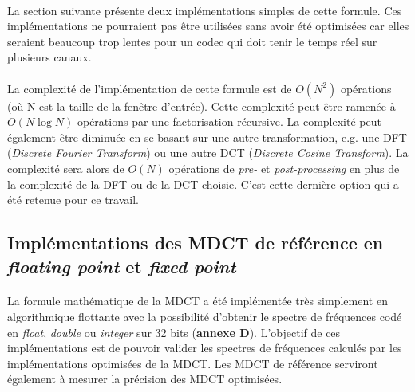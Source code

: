 \documentclass{article}
\begin{document}
    \paragraph{}
    La section suivante présente deux implémentations simples de cette formule. Ces implémentations ne pourraient pas être utilisées sans avoir été optimisées car elles seraient beaucoup trop lentes pour un codec qui doit tenir le temps réel sur plusieurs canaux.

    \paragraph{}
    La complexité de l'implémentation de cette formule est de $O(N^2)$ opérations (où N est la taille de la fenêtre d'entrée). Cette complexité peut être ramenée à $O(N \log N)$ opérations par une factorisation récursive. La complexité peut également être diminuée en se basant sur une autre transformation, e.g. une DFT (\emph{Discrete Fourier Transform}) ou une autre DCT (\emph{Discrete Cosine Transform}). La complexité sera alors de $O(N)$ opérations de \emph{pre-} et \emph{post-processing} en plus de la complexité de la DFT ou de la DCT choisie\cite{wiki:MDCT}. C'est cette dernière option qui a été retenue pour ce travail.


    \subsection{Implémentations des MDCT de référence en \emph{floating point} et \emph{fixed point}}

    \paragraph{}
    La formule mathématique de la MDCT a été implémentée très simplement en algorithmique flottante avec la possibilité d'obtenir le spectre de fréquences codé en \emph{float}, \emph{double} ou \emph{integer} sur 32 bits (\textbf{annexe D}). L'objectif de ces implémentations est de pouvoir valider les spectres de fréquences calculés par les implémentations optimisées de la MDCT. Les MDCT de référence serviront également à mesurer la précision des MDCT optimisées.
\end{document}
